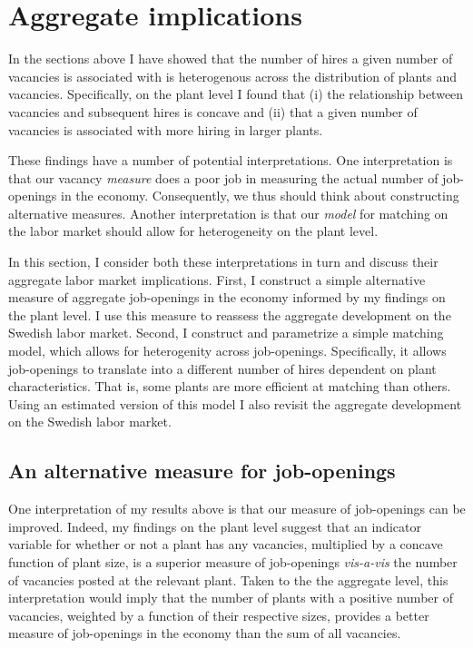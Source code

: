 \section{Aggregate implications}
\label{sec:agg_implications}

In the sections above I have showed that the number of hires a given number of vacancies is associated with is heterogenous across the distribution of plants and vacancies. Specifically, on the plant level I found that (i) the relationship between vacancies and subsequent hires is concave and (ii) that a given number of vacancies is associated with more hiring in larger plants.

These findings have a number of potential interpretations. One interpretation is that our vacancy \emph{measure} does a poor job in measuring the actual number of job-openings in the economy. Consequently, we thus should think about constructing alternative measures. Another interpretation is that our \emph{model} for matching on the labor market should allow for heterogeneity on the plant level. 

In this section, I consider both these interpretations in turn and discuss their aggregate labor market implications. First, I construct a simple alternative measure of aggregate job-openings in the economy informed by my findings on the plant level. I use this measure to reassess the aggregate development on the Swedish labor market. Second, I construct and parametrize a simple matching model, which allows for heterogenity across job-openings. Specifically, it allows job-openings to translate into a different number of hires dependent on plant characteristics. That is, some plants are more efficient at matching than others. Using an estimated version of this model I also revisit the aggregate development on the Swedish labor market. 

\subsection{An alternative measure for job-openings}

One interpretation of my results above is that our measure of job-openings can be improved. Indeed, my findings on the plant level suggest that an indicator variable for whether or not a plant has any vacancies, multiplied by a concave function of plant size, is a superior measure of job-openings \emph{vis-a-vis} the number of vacancies posted at the relevant plant. Taken to the the aggregate level, this interpretation would imply that the number of plants with a positive number of vacancies, weighted by a function of their respective sizes, provides a better measure of job-openings in the economy than the sum of all vacancies. 

